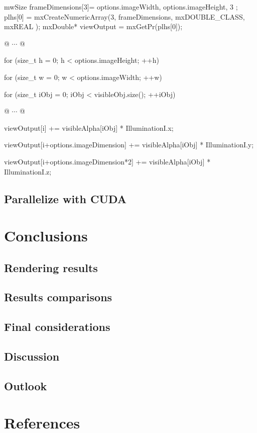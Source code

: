 \documentclass[12pt,a4paper]{extarticle}
\begin{document}
\begin{cpp}[caption={Composing illuminated colors back into output image, preserving objects semi-transparency using Porter's over operator},label=code:compositing]
mwSize frameDimensions[3]={ 
	options.imageWidth,
	options.imageHeight,
	3
};
plhs[0] = mxCreateNumericArray(3, 
	frameDimensions, 
	mxDOUBLE_CLASS, 
	mxREAL
);
mxDouble* viewOutput = mxGetPr(plhs[0]);

@ $\cdots$ @

for (size_t h = 0; h < options.imageHeight; ++h) {
	for (size_t w = 0; w < options.imageWidth; ++w) {
		for (size_t iObj = 0; iObj < visibleObj.size(); ++iObj) {

			@ $\cdots$ @

			viewOutput[i] += visibleAlpha[iObj] * IlluminationI.x;
			
			viewOutput[i+options.imageDimension] += 
				visibleAlpha[iObj] * IlluminationI.y;
			
			viewOutput[i+options.imageDimension*2] += 
				visibleAlpha[iObj] * IlluminationI.z;			
		}
	}
}
\end{cpp}
\pagebreak
\subsection{Parallelize with CUDA} 


\section{Conclusions} 
\subsection{Rendering results} 
\subsection{Results comparisons} 
\subsection{Final considerations} 
\subsection{Discussion} 
\subsection{Outlook}
\pagebreak
\section*{References}
\nocite{*}
\printbibliography[heading=none]{}
\end{document}
